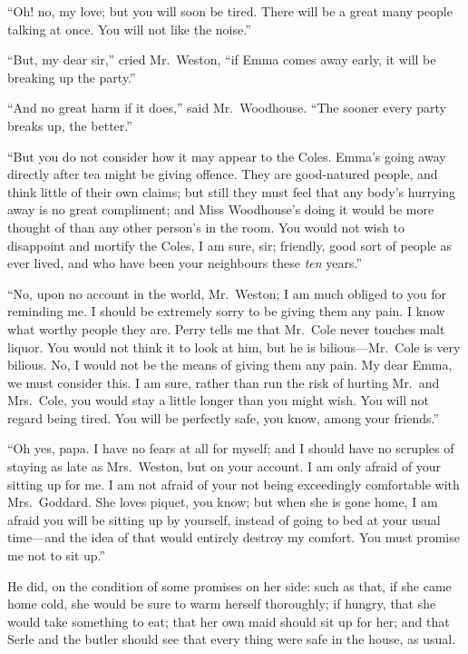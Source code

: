 ``Oh! no, my love; but you will soon be tired.  There will be
a great many people talking at once.  You will not like the noise.''

``But, my dear sir,'' cried Mr.\ Weston, ``if Emma comes away early,
it will be breaking up the party.''

``And no great harm if it does,'' said Mr.\ Woodhouse.  ``The sooner
every party breaks up, the better.''

``But you do not consider how it may appear to the Coles.
Emma's going away directly after tea might be giving offence.
They are good-natured people, and think little of their own claims;
but still they must feel that any body's hurrying away is no
great compliment; and Miss Woodhouse's doing it would be more thought
of than any other person's in the room.  You would not wish to disappoint
and mortify the Coles, I am sure, sir; friendly, good sort of people
as ever lived, and who have been your neighbours these \emph{ten} years.''

``No, upon no account in the world, Mr.\ Weston; I am much obliged
to you for reminding me.  I should be extremely sorry to be giving
them any pain.  I know what worthy people they are.  Perry tells
me that Mr.\ Cole never touches malt liquor.  You would not think
it to look at him, but he is bilious---Mr.\ Cole is very bilious.
No, I would not be the means of giving them any pain.  My dear Emma,
we must consider this.  I am sure, rather than run the risk of hurting
Mr.\ and Mrs.\ Cole, you would stay a little longer than you might wish.
You will not regard being tired.  You will be perfectly safe,
you know, among your friends.''

``Oh yes, papa.  I have no fears at all for myself; and I should have
no scruples of staying as late as Mrs.\ Weston, but on your account.
I am only afraid of your sitting up for me.  I am not afraid
of your not being exceedingly comfortable with Mrs.\ Goddard.
She loves piquet, you know; but when she is gone home, I am afraid
you will be sitting up by yourself, instead of going to bed at your
usual time---and the idea of that would entirely destroy my comfort.
You must promise me not to sit up.''

He did, on the condition of some promises on her side:  such as that,
if she came home cold, she would be sure to warm herself thoroughly;
if hungry, that she would take something to eat; that her own maid
should sit up for her; and that Serle and the butler should see
that every thing were safe in the house, as usual.



